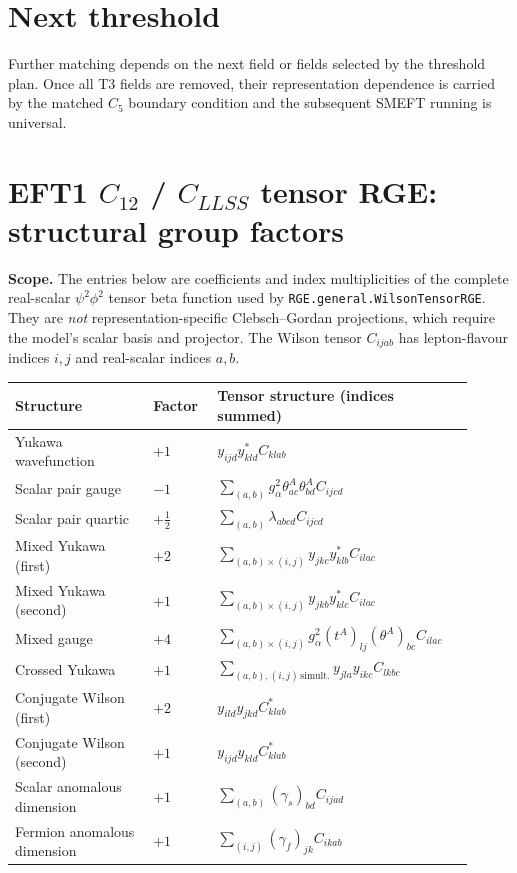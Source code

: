 \documentclass[9pt]{article}
\begin{document}
\section*{Next threshold}
Further matching depends on the next field or fields selected by the threshold plan.  Once all T3 fields are removed, their representation dependence is carried by the matched $C_5$ boundary condition and the subsequent SMEFT running is universal.

\clearpage
\section*{EFT1 $C_{12}$ / $C_{LLSS}$ tensor RGE: structural group factors}
\textbf{Scope.} The entries below are coefficients and index multiplicities
of the complete real-scalar $\psi^2\phi^2$ tensor beta function used by
\texttt{RGE.general.WilsonTensorRGE}. They are \emph{not} representation-specific
Clebsch--Gordan projections, which require the model's scalar basis and
projector. The Wilson tensor $C_{ijab}$ has lepton-flavour indices $i,j$
and real-scalar indices $a,b$.

\begin{longtable}{@{}p{0.29\linewidth}p{0.13\linewidth}p{0.49\linewidth}@{}}
\toprule
Structure & Factor & Tensor structure (indices summed) \\
\midrule
Yukawa wavefunction & $+1$ & $y_{ijd}y^*_{kld}C_{klab}$ \\
Scalar pair gauge & $-1$ & $\sum_{(a,b)}g_\alpha^2\theta^A_{ac}\theta^A_{bd}C_{ijcd}$ \\
Scalar pair quartic & $+\frac{1}{2}$ & $\sum_{(a,b)}\lambda_{abcd}C_{ijcd}$ \\
Mixed Yukawa (first) & $+2$ & $\sum_{(a,b)\times(i,j)}y_{jkc}y^*_{klb}C_{ilac}$ \\
Mixed Yukawa (second) & $+1$ & $\sum_{(a,b)\times(i,j)}y_{jkb}y^*_{klc}C_{ilac}$ \\
Mixed gauge & $+4$ & $\sum_{(a,b)\times(i,j)}g_\alpha^2(t^A)_{lj}(\theta^A)_{bc}C_{ilac}$ \\
Crossed Yukawa & $+1$ & $\sum_{(a,b),(i,j)\,\mathrm{simult.}}y_{jla}y_{ikc}C_{lkbc}$ \\
Conjugate Wilson (first) & $+2$ & $y_{ild}y_{jkd}C^*_{klab}$ \\
Conjugate Wilson (second) & $+1$ & $y_{ijd}y_{kld}C^*_{klab}$ \\
Scalar anomalous dimension & $+1$ & $\sum_{(a,b)}(\gamma_s)_{bd}C_{ijad}$ \\
Fermion anomalous dimension & $+1$ & $\sum_{(i,j)}(\gamma_f)_{jk}C_{ikab}$ \\
\bottomrule
\end{longtable}
\end{document}
